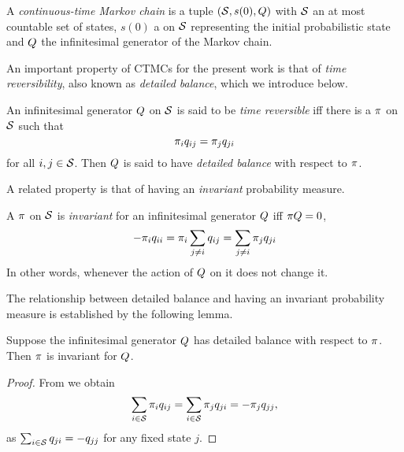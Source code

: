 \begin{definition}[CTMC]%
  A \emph{continuous-time Markov chain} is a tuple
  $\left(\mathcal{S}, s(0), Q\right)$ with
  $\mathcal{S}$ an at most countable set of states,
  $s(0)$ a \pmf on $\mathcal{S}$
  representing the initial probabilistic state and
  $Q$ the infinitesimal generator of the Markov chain.
\end{definition}

An important property of CTMCs for the present work is that of
\emph{time reversibility}, also known as \emph{detailed balance},
which we introduce below.

\begin{definition}
  An infinitesimal generator $Q$ on $\mathcal{S}$
  is said to be \emph{time reversible} iff
  there is a \pmf $\pi$ on $\mathcal{S}$ such that
  \begin{equation}
    \label{eq:detailed-balance}
    \pi_i q_{ij} = \pi_j q_{ji}
  \end{equation}
  for all $i,j \in \mathcal{S}$.
  Then $Q$ is said to have \emph{detailed balance}
  with respect to $\pi$.
\end{definition}

A related property is that of
having an \emph{invariant} probability measure.

\begin{definition}
  A \pmf $\pi$ on $\mathcal{S}$ is
  \emph{invariant} for an infinitesimal generator $Q$
  iff $\pi Q = 0$, \ie
  \[ -\pi_i q_{ii} = \pi_i \sum_{j \neq i} q_{ij}
                  = \sum_{j \neq i} \pi_j q_{ji} \]
  In other words,
  whenever the action of $Q$ on it does not change it.
\end{definition}

The relationship between %
detailed balance and having an invariant probability measure
is established by the following lemma.

\begin{lemma}
  Suppose the infinitesimal generator $Q$
  has detailed balance with respect to $\pi$.
  Then $\pi$ is invariant for $Q$.
\end{lemma}
\begin{proof}
  From  we obtain
  \[ \sum_{i \in \mathcal{S}} \pi_i q_{ij} =
     \sum_{i \in \mathcal{S}} \pi_j q_{ji} = -\pi_j q_{jj}, \]
  as $\sum_{i \in \mathcal{S}} q_{ji} = -q_{jj}$ for any fixed state $j$.
\end{proof}

